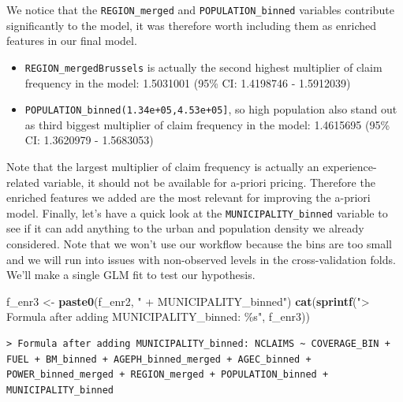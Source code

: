 \documentclass[
  english,
  11pt,
]{article}
\newenvironment{Shaded}{\begin{snugshade}}{\end{snugshade}}
\newcommand{\FunctionTok}[1]{\textcolor[rgb]{0.13,0.29,0.53}{\textbf{#1}}}
\newcommand{\NormalTok}[1]{#1}
\newcommand{\OtherTok}[1]{\textcolor[rgb]{0.56,0.35,0.01}{#1}}
\newcommand{\StringTok}[1]{\textcolor[rgb]{0.31,0.60,0.02}{#1}}
\providecommand{\tightlist}{%
  \setlength{\itemsep}{0pt}\setlength{\parskip}{0pt}}
\begin{document}
We notice that the \texttt{REGION\_merged} and
\texttt{POPULATION\_binned} variables contribute significantly to the
model, it was therefore worth including them as enriched features in our
final model.

\begin{itemize}
\tightlist
\item
  \texttt{REGION\_mergedBrussels} is actually the second highest
  multiplier of claim frequency in the model: 1.5031001 (95\% CI:
  1.4198746 - 1.5912039)
\item
  \texttt{POPULATION\_binned(1.34e+05,4.53e+05{]}}, so high population
  also stand out as third biggest multiplier of claim frequency in the
  model: 1.4615695 (95\% CI: 1.3620979 - 1.5683053)
\end{itemize}

Note that the largest multiplier of claim frequency is actually an
experience-related variable, it should not be available for a-priori
pricing. Therefore the enriched features we added are the most relevant
for improving the a-priori model. Finally, let's have a quick look at
the \texttt{MUNICIPALITY\_binned} variable to see if it can add anything
to the urban and population density we already considered. Note that we
won't use our workflow because the bins are too small and we will run
into issues with non-observed levels in the cross-validation folds.
We'll make a single GLM fit to test our hypothesis.

\begin{Shaded}
\begin{Highlighting}[]
\NormalTok{f\_enr3 }\OtherTok{\textless{}{-}} \FunctionTok{paste0}\NormalTok{(f\_enr2, }\StringTok{" + MUNICIPALITY\_binned"}\NormalTok{)}
\FunctionTok{cat}\NormalTok{(}\FunctionTok{sprintf}\NormalTok{(}\StringTok{"\textgreater{} Formula after adding MUNICIPALITY\_binned: \%s"}\NormalTok{, f\_enr3))}
\end{Highlighting}
\end{Shaded}

\begin{verbatim}
> Formula after adding MUNICIPALITY_binned: NCLAIMS ~ COVERAGE_BIN + FUEL + BM_binned + AGEPH_binned_merged + AGEC_binned + POWER_binned_merged + REGION_merged + POPULATION_binned + MUNICIPALITY_binned
\end{verbatim}
\end{document}
